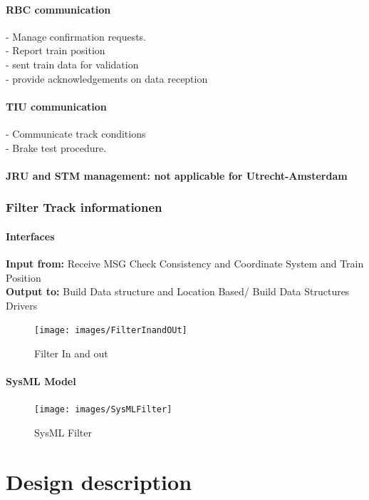 \documentclass{template/openetcs_report}
\begin{document}
\subsubsection{RBC communication}
- Manage confirmation requests.\\
- Report train position\\
- sent train data for validation\\
- provide acknowledgements on data reception\\

\subsubsection{TIU communication}
- Communicate track conditions\\
- Brake test procedure.\\

\subsubsection{JRU and \gls{STM} management: not applicable for Utrecht-Amsterdam}

\newpage
\subsection{Filter Track informationen}

\subsubsection{Interfaces}
\textbf{Input from:} Receive MSG Check Consistency and Coordinate System and Train Position\\
\textbf{Output to:} Build Data structure and Location Based/ Build Data Structures Drivers\\
\begin{figure}[hbtp]
\centering
\texttt{[image: images/FilterInandOUt]}
\caption{Filter In and out}
\end{figure}

\subsubsection{SysML Model}
\begin{figure}[hbtp]
\centering
\texttt{[image: images/SysMLFilter]}
\caption{SysML Filter}
\end{figure}

\chapter{Design description}
\end{document}
